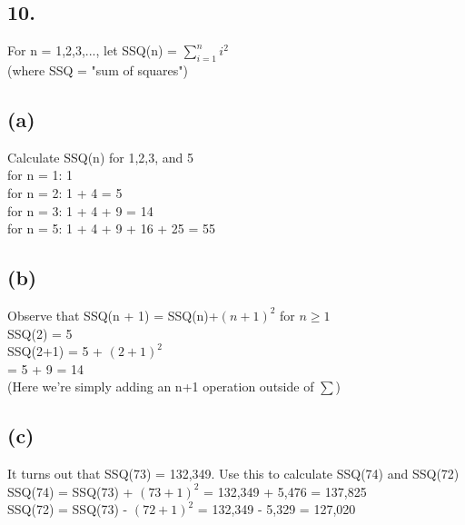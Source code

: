 \documentclass[11pt]{article}
\begin{document}
\subsection*{10.}
\begin{center}
For n = 1,2,3,..., let SSQ(n) = $\sum_{i=1}^{n} i^{2}$\\
(where SSQ = "sum of squares")
\end{center}

\subsection*{(a)}
\begin{center}
Calculate SSQ(n) for 1,2,3, and 5\\
\hfill \break
for n = 1: 1\\
for n = 2: 1 + 4 = 5\\
for n = 3: 1 + 4 + 9 = 14\\
for n = 5: 1 + 4 + 9 + 16 + 25 = 55\\
\end{center}

\subsection*{(b)}
\begin{center}
Observe that SSQ(n + 1) = SSQ(n)+$(n+1)^{2}$ for $n \geq 1$\\
\hfill \break
SSQ(2) = 5\\
SSQ(2+1) = 5 + $(2+1)^{2}$\\
= 5 + 9 = 14\\
(Here we're simply adding an n+1 operation outside of $\sum$)
\end{center}

\subsection*{(c)}
\begin{center}
It turns out that SSQ(73) = 132,349. Use this to calculate SSQ(74) and SSQ(72)\\
\hfill \break
SSQ(74) = SSQ(73) + $(73+1)^{2}$ = 132,349 + 5,476 = 137,825\\
SSQ(72) = SSQ(73) - $(72+1)^{2}$ = 132,349 - 5,329 = 127,020
\end{center}
%
%
\end{document}
